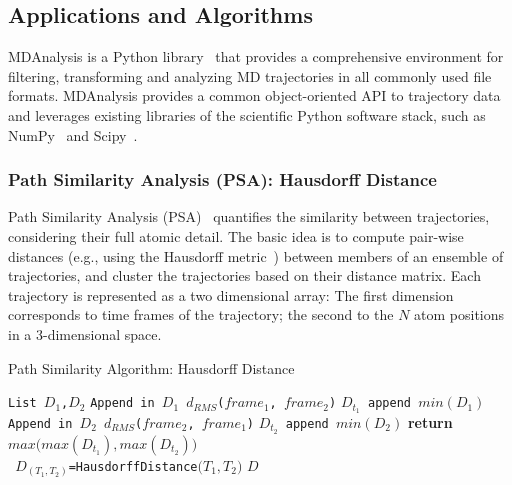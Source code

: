 \subsection{Applications and Algorithms}
\label{ssec:mda}

MDAnalysis is a Python library~\cite{michaud2011mdanalysis,gowers2016mdanalysis}
that provides a comprehensive environment for filtering, transforming and
analyzing MD trajectories in all commonly used file formats. MDAnalysis provides
a common object-oriented API to trajectory data and leverages existing libraries
of the scientific Python software stack, such as NumPy~\cite{numpy} and
Scipy~\cite{scipy}.

\subsubsection*{Path Similarity Analysis (PSA): Hausdorff Distance}

Path Similarity Analysis (PSA)~\cite{seyler2015path} quantifies the
similarity between trajectories, considering their full atomic detail. The
basic idea is to compute pair-wise distances (e.g., using the Hausdorff
metric~\cite{huttenlocher1993comparing}) between members of an ensemble of
trajectories, and cluster the trajectories based on their distance matrix. Each
trajectory is represented as a two dimensional array: The first dimension
corresponds to time frames of the trajectory; the second to the $N$ atom
positions in a 3-dimensional space.

\begin{algorithm}[t]
    \scriptsize
    \caption{Path Similarity Algorithm: Hausdorff Distance}
    \label{alg:hausdorff}
    \begin{algorithmic}[1]
        \State \texttt{List $D_1$,$D_2$}
        \State \texttt{Append in $D_1$ $d_{RMS}$($frame_1$, $frame_2$)}
        \EndFor
        \State \texttt{$D_{t_1}$ append $min(D_1)$}
        \EndFor
        \State \texttt{Append in $D_2$ $d_{RMS}$($frame_2$, $frame_1$)}
        \EndFor
        \State\texttt{$D_{t_2}$ append $min(D_2)$}
        \EndFor
        \State \textbf{return} $max\Big(max(D_{t_1}),max(D_{t_2})\Big)$
        \EndProcedure
        \\
        \State \texttt{ $D_{( T_1,T_2 )}$=HausdorffDistance$\Big( T_1,T_2 \Big)$}
        \EndFor
        \EndFor
        \State \Return $D$
        \EndProcedure
    \end{algorithmic}
\end{algorithm}

